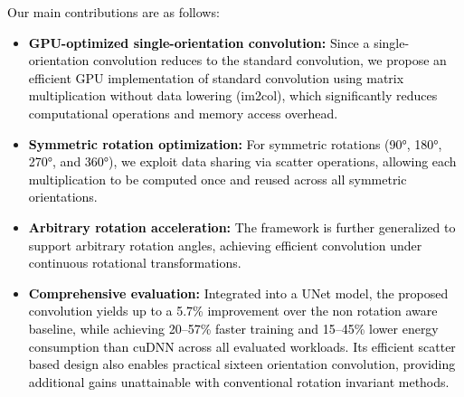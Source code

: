 \textcolor{black}{Our main contributions are as follows:}
\begin{itemize}
\item \textcolor{black}{\textbf{GPU-optimized single-orientation convolution:} Since a single-orientation convolution reduces to the standard convolution, we propose an efficient GPU implementation of standard convolution using matrix multiplication without data lowering (im2col), which significantly reduces computational operations and memory access overhead.}

\item \textcolor{black}{\textbf{Symmetric rotation optimization:} For symmetric rotations (90°, 180°, 270°, and 360°), we exploit data sharing via scatter operations, allowing each multiplication to be computed once and reused across all symmetric orientations.}

\item \textcolor{black}{\textbf{Arbitrary rotation acceleration:} The framework is further generalized to support arbitrary rotation angles, achieving efficient convolution under continuous rotational transformations.}

\item \textcolor{black}{\textbf{Comprehensive evaluation:} Integrated into a UNet model, the proposed convolution yields up to a 5.7\% improvement over the non rotation aware baseline, while achieving 20–57\% faster training and 15–45\% lower energy consumption than cuDNN across all evaluated workloads. Its efficient scatter based design also enables practical sixteen orientation convolution, providing additional gains unattainable with conventional rotation invariant methods.}
\end{itemize}


